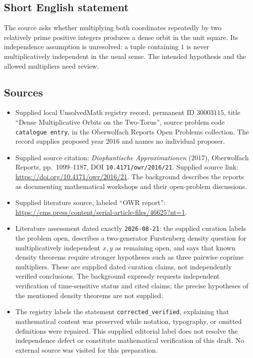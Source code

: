 \documentclass[11pt]{article}
\begin{document}
\subsection{Short English statement}
The source asks whether multiplying both coordinates repeatedly by two relatively prime positive integers produces a dense orbit in the unit square. Its independence assumption is unresolved: a tuple containing \(1\) is never multiplicatively independent in the usual sense. The intended hypothesis and the allowed multipliers need review.
\subsection{Sources}
\begin{itemize}
\item Supplied local UnsolvedMath registry record, permanent ID \(30003115\), title ``Dense Multiplicative Orbits on the Two-Torus'', source problem code \texttt{catalogue entry}, in the Oberwolfach Reports Open Problems collection. The record supplies proposed year \(2016\) and names no individual proposer.
\item Supplied source citation: \emph{Diophantische Approximationen} (2017), Oberwolfach Reports, pp.~1099--1187, DOI \texttt{10.4171/owr/2016/21}. Supplied source link: \url{https://doi.org/10.4171/owr/2016/21}. The background describes the reports as documenting mathematical workshops and their open-problem discussions.
\item Supplied literature source, labeled ``OWR report'': \url{https://ems.press/content/serial-article-files/46625?nt=1}.
\item Literature assessment dated exactly \texttt{2026-08-21}: the supplied curation labels the problem open, describes a two-generator Furstenberg density question for multiplicatively independent \(x,y\) as remaining open, and says that known density theorems require stronger hypotheses such as three pairwise coprime multipliers. These are supplied dated curation claims, not independently verified conclusions. The background expressly requests independent verification of time-sensitive status and cited claims; the precise hypotheses of the mentioned density theorems are not supplied.
\item The registry labels the statement \texttt{corrected\_verified}, explaining that mathematical content was preserved while notation, typography, or omitted definitions were repaired. This supplied editorial label does not resolve the independence defect or constitute mathematical verification of this draft. No external source was visited for this preparation.
\end{itemize}
\end{document}
